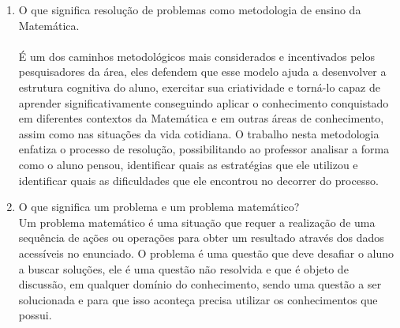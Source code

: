 \documentclass[a4paper, 12pt]{article}
\begin{document}
\begin{enumerate}
\item O que significa resolução de problemas como metodologia de ensino da Matemática. \\ \\
  É um dos caminhos metodológicos mais considerados e incentivados pelos pesquisadores da área, eles defendem que esse modelo ajuda a desenvolver a estrutura cognitiva do aluno, exercitar sua criatividade e torná-lo capaz de aprender significativamente conseguindo aplicar o conhecimento conquistado em diferentes contextos da Matemática e em outras áreas de conhecimento, assim como nas situações da vida cotidiana. O trabalho nesta metodologia enfatiza o processo de resolução, possibilitando ao professor analisar a forma como o aluno pensou, identificar quais as estratégias que ele utilizou e identificar quais as dificuldades que ele encontrou no decorrer do processo.

\item O que significa um problema e um problema matemático?  \\
Um problema matemático é uma situação que requer a realização de uma sequência de ações ou operações para obter um resultado através dos dados acessíveis no enunciado. O problema é uma questão que deve desafiar o aluno a buscar soluções, ele é uma questão não resolvida e que é objeto de discussão, em qualquer domínio do conhecimento, sendo uma questão a ser solucionada e para que isso aconteça precisa utilizar os conhecimentos que possui. 
  

\end{enumerate}
\end{document}
